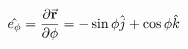 \begin{equation}
  \hat{e_\phi} 
  = \pdv{\va{r}}{\phi}
  = - \sin{\phi}\hat{j} + \cos{\phi}\hat{k}
\end{equation}
